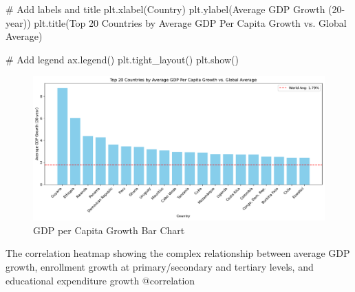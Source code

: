 \documentclass[
  letterpaper,
  DIV=11,
  numbers=noendperiod]{scrartcl}
\newenvironment{Shaded}{\begin{snugshade}}{\end{snugshade}}
\newcommand{\CommentTok}[1]{\textcolor[rgb]{0.37,0.37,0.37}{#1}}
\newcommand{\NormalTok}[1]{\textcolor[rgb]{0.00,0.23,0.31}{#1}}
\newcommand{\StringTok}[1]{\textcolor[rgb]{0.13,0.47,0.30}{#1}}
\begin{document}
\begin{Shaded}
\begin{Highlighting}[]
\CommentTok{\# Add labels and title}
\NormalTok{plt.xlabel(}\StringTok{\textquotesingle{}Country\textquotesingle{}}\NormalTok{)}
\NormalTok{plt.ylabel(}\StringTok{\textquotesingle{}Average GDP Growth (20{-}year)\textquotesingle{}}\NormalTok{)}
\NormalTok{plt.title(}\StringTok{\textquotesingle{}Top 20 Countries by Average GDP Per Capita Growth vs. Global Average\textquotesingle{}}\NormalTok{)}

\CommentTok{\# Add legend}
\NormalTok{ax.legend()}
\NormalTok{plt.tight\_layout()}
\NormalTok{plt.show()}
\end{Highlighting}
\end{Shaded}

\begin{figure}[H]

{\centering \includegraphics{report_files/figure-pdf/gdp-growth-hist-output-1.pdf}

}

\caption{GDP per Capita Growth Bar Chart}

\end{figure}%

The correlation heatmap showing the complex relationship between average
GDP growth, enrollment growth at primary/secondary and tertiary levels,
and educational expenditure growth @correlation
\end{document}
